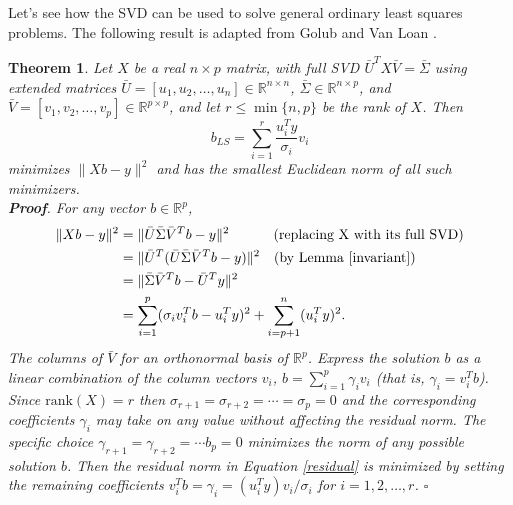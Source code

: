 \documentclass[10pt]{article} %
\newtheorem{thm}{Theorem}
\newcommand{\R}{{\mathbb R}}
\begin{document}
Let's see how the SVD can be used to solve general ordinary least squares
problems. The following result is adapted from Golub and Van Loan
\cite[Theorem 5.5.1]{gvl}.
\begin{thm}
Let $X$ be a real $n\times p$ matrix, with full SVD
$\bar{U}^TX\bar{V} = \bar{\Sigma}$ using extended matrices
$\bar{U} = [u_1, u_2, \ldots, u_n] \in\R^{n\times n}$,
$\bar{\Sigma}\in\R^{n\times p}$, and
$\bar{V} = [v_1, v_2, \ldots, v_p]\in\R^{p\times p}$,
and let $r \le \min\{n, p\}$ be the rank of $X$. Then
\begin{equation}\label{SVDLS}
b_{LS} = \sum_{i=1}^r \frac{u_i^T y}{\sigma_i}v_i
\end{equation}
minimizes $\|X b - y\|^2$ and has the smallest Euclidean norm of all
such minimizers.
\\
{\bf Proof}. For any vector $b\in\R^p$, 
\begin{align}
\|X b - y\|^2 &= \|\bar{U}\bar{\Sigma}\bar{V}^T b - y\|^2 \qquad\,\,\,\,\,\,\, (\mbox{replacing X with its full SVD})\nonumber\\
&= \|\bar{U}^T(\bar{U}\bar{\Sigma}\bar{V}^T b - y)\|^2 \,\,\,\,\,\, (\mbox{by Lemma \ref{invariant}})\nonumber\\
&= \|\bar{\Sigma}\bar{V}^T b - \bar{U}^Ty\|^2 \nonumber \\
&= \sum_{i=1}^p(\sigma_iv_i^T b - u_i^Ty)^2 + \sum_{i=p + 1}^n(u_i^Ty)^2. \label{residual}
\end{align}
The columns of $\bar{V}$ for an orthonormal basis of $\R^p$.
Express the solution $b$ as a linear combination of the column vectors $v_i$,
$b = \sum_{i=1}^p \gamma_i v_i$ (that is, $\gamma_i = v_i^Tb$). Since $\mathrm{rank}(X)=r$ then
$\sigma_{r+1} = \sigma_{r+2} = \cdots = \sigma_p = 0$ and the corresponding
coefficients $\gamma_i$ may take on any value without affecting the
residual norm.  The specific choice
$\gamma_{r+1} = \gamma_{r+2} = \cdots b_p = 0$
minimizes the norm of any possible solution $b$.
Then the residual norm in Equation \ref{residual} is minimized by setting the remaining coefficients
$v_i^Tb = \gamma_i = (u_i^T y) v_i/ \sigma_i$ for $i=1, 2, \ldots, r$.
$\square$
\end{thm}
\end{document}
